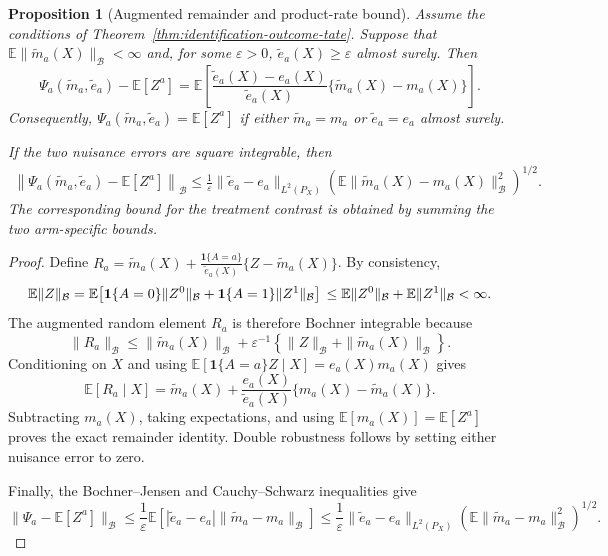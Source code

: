 \documentclass[11pt,a4paper]{article}
\theoremstyle{plain}
\newtheorem{proposition}[theorem]{Proposition}
\theoremstyle{definition}
\theoremstyle{remark}
\newcommand{\1}{\mathbbm{1}}
\begin{document}
\begin{proposition}[Augmented remainder and product-rate bound]
\label{prop:product-rate-bias}
Assume the conditions of Theorem~\ref{thm:identification-outcome-tate}. Suppose that \(\mathbb E\|\widetilde m_a(X)\|_{\mathcal B}<\infty\) and, for some
\(\varepsilon>0\), \(\widetilde e_a(X)\geq\varepsilon\) almost surely. Then
\[
\Psi_a(\widetilde m_a,\widetilde e_a)-\mathbb E[Z^a]
=
\mathbb E\left[
\frac{\widetilde e_a(X)-e_a(X)}
     {\widetilde e_a(X)}
\{\widetilde m_a(X)-m_a(X)\}
\right].
\]
Consequently,
\(\Psi_a(\widetilde m_a,\widetilde e_a)=\mathbb E[Z^a]\) if either
\(\widetilde m_a=m_a\) or \(\widetilde e_a=e_a\) almost surely.

If the two nuisance errors are square integrable, then
\[
\begin{aligned}
\left\|
\Psi_a(\widetilde m_a,\widetilde e_a)-\mathbb E[Z^a]
\right\|_{\mathcal B}
\leq
\frac{1}{\varepsilon}
\|\widetilde e_a-e_a\|_{L^2(P_X)}
\left(
\mathbb E
\|\widetilde m_a(X)-m_a(X)\|_{\mathcal B}^{2}
\right)^{1/2}.
\end{aligned}
\]
The corresponding bound for the treatment contrast is obtained by summing the two arm-specific bounds.
\end{proposition}

\begin{proof}
Define \(R_a = \widetilde m_a(X) + \frac{\mathbf 1\{A=a\}}{\widetilde e_a(X)} \{Z-\widetilde m_a(X)\}\). By consistency,
\[
\mathbb E\|Z\|_{\mathcal B}
=
\mathbb E\!\left[
\mathbf 1\{A=0\}\|Z^0\|_{\mathcal B}
+
\mathbf 1\{A=1\}\|Z^1\|_{\mathcal B}
\right] \\
\leq
\mathbb E\|Z^0\|_{\mathcal B}
+
\mathbb E\|Z^1\|_{\mathcal B}
<\infty.
\]
The augmented random element \(R_a\) is therefore Bochner integrable because
\[
\|R_a\|_{\mathcal B}
\leq
\|\widetilde m_a(X)\|_{\mathcal B}
+
\varepsilon^{-1}
\left\{
\|Z\|_{\mathcal B}
+
\|\widetilde m_a(X)\|_{\mathcal B}
\right\}.
\]
Conditioning on \(X\) and using
\(\mathbb E[\mathbf 1\{A=a\}Z\mid X]=e_a(X)m_a(X)\) gives
\[
\mathbb E[R_a\mid X]
=
\widetilde m_a(X)
+
\frac{e_a(X)}{\widetilde e_a(X)}
\{m_a(X)-\widetilde m_a(X)\}.
\]
Subtracting \(m_a(X)\), taking expectations, and using
\(\mathbb E[m_a(X)]=\mathbb E[Z^a]\) proves the exact remainder identity. Double robustness follows by setting either nuisance error to zero.

Finally, the Bochner--Jensen and Cauchy--Schwarz inequalities give
\[
\|\Psi_a-\mathbb E[Z^a]\|_{\mathcal B}
\leq
\frac{1}{\varepsilon}
\mathbb E\left[
|\widetilde e_a-e_a|
\|\widetilde m_a-m_a\|_{\mathcal B}
\right] 
\leq
\frac{1}{\varepsilon}
\|\widetilde e_a-e_a\|_{L^2(P_X)}
\left(
\mathbb E\|\widetilde m_a-m_a\|_{\mathcal B}^{2}
\right)^{1/2}.
\]
\end{proof}
\end{document}
